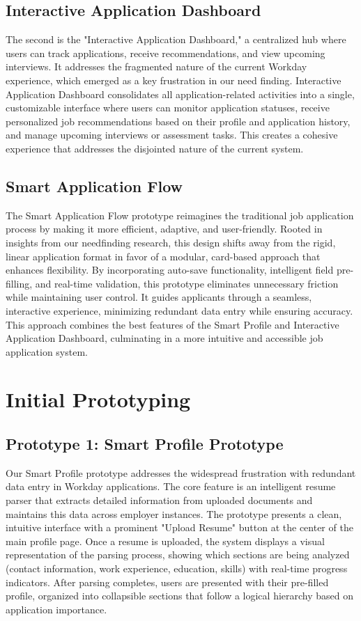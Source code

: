 \documentclass[
	letterpaper, %
]{jdf}
\begin{document}
\begin{sloppypar}
\subsection{Interactive Application Dashboard}
The second is the "Interactive Application Dashboard," a centralized hub where users can track applications, receive recommendations, and view upcoming interviews. It addresses the fragmented nature of the current Workday experience, which emerged as a key frustration in our need finding. Interactive Application Dashboard consolidates all application-related activities into a single, customizable interface where users can monitor application statuses, receive personalized job recommendations based on their profile and application history, and manage upcoming interviews or assessment tasks. This creates a cohesive experience that addresses the disjointed nature of the current system.

\subsection{Smart Application Flow}
The Smart Application Flow prototype reimagines the traditional job application process by making it more efficient, adaptive, and user-friendly. Rooted in insights from our needfinding research, this design shifts away from the rigid, linear application format in favor of a modular, card-based approach that enhances flexibility. By incorporating auto-save functionality, intelligent field pre-filling, and real-time validation, this prototype eliminates unnecessary friction while maintaining user control. It guides applicants through a seamless, interactive experience, minimizing redundant data entry while ensuring accuracy. This approach combines the best features of the Smart Profile and Interactive Application Dashboard, culminating in a more intuitive and accessible job application system.

\hfill \break
\hfill \break


\section{Initial Prototyping}
\subsection{Prototype 1: Smart Profile Prototype}
Our Smart Profile prototype addresses the widespread frustration with redundant data entry in Workday applications. The core feature is an intelligent resume parser that extracts detailed information from uploaded documents and maintains this data across employer instances.
The prototype presents a clean, intuitive interface with a prominent "Upload Resume" button at the center of the main profile page. Once a resume is uploaded, the system displays a visual representation of the parsing process, showing which sections are being analyzed (contact information, work experience, education, skills) with real-time progress indicators. After parsing completes, users are presented with their pre-filled profile, organized into collapsible sections that follow a logical hierarchy based on application importance.


\end{sloppypar}
\end{document}
